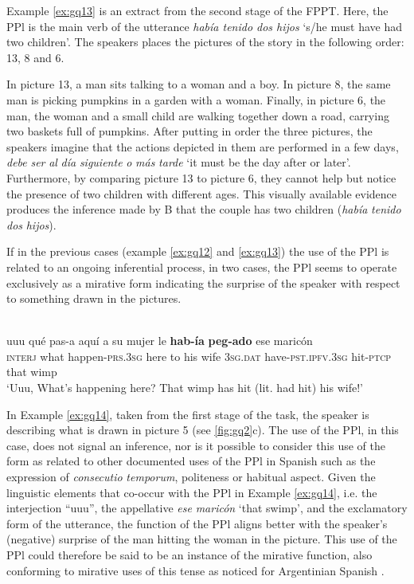\documentclass[output=paper]{langsci/langscibook}
\begin{document}
Example \ref{ex:gq13} is an extract from the second stage of the FPPT. Here, the PPl is the main verb of the utterance \textit{había tenido dos hijos} ‘s/he must have had two children’. The speakers places the pictures of the story in the following order: 13, 8 and 6. %


In picture 13, a man sits talking to a woman and a boy. In picture 8, the same man is picking pumpkins in a garden with a woman. Finally, in picture 6, the man, the woman and a small child are walking together down a road, carrying two baskets full of pumpkins. After putting in order the three pictures, the speakers imagine that the actions depicted in them are performed in a few days, \textit{debe} \textit{ser} \textit{al} \textit{día} \textit{siguiente} \textit{o} \textit{más} \textit{tarde} ‘it must be the day after or later’. Furthermore, by comparing picture 13 to picture 6, they cannot help but notice the presence of two children with different ages. This visually available evidence produces the inference made by B that the couple has two children (\textit{había} \textit{tenido} \textit{dos} \textit{hijos}). 

If in the previous cases (example \ref{ex:gq12} and \ref{ex:gq13}) the use of the PPl is related to an ongoing inferential process, in two cases, the PPl seems to operate exclusively as a mirative form indicating the surprise of the speaker with respect to something drawn in the pictures.

\ea \label{ex:gq14}
\\
	\gll uuu qué pas-a aquí a su mujer le \textbf{hab-ía} \textbf{peg-ado} ese maricón\\
	\textsc{interj} what happen-\textsc{prs.3sg} here to his wife \textsc{3sg.dat} have-\textsc{pst.ipfv.3sg} hit-\textsc{ptcp} that wimp\\
	\glt ‘Uuu, What’s happening here? That wimp has hit (lit. had hit) his wife!’
\z

In Example \ref{ex:gq14}, taken from the first stage of the task, the speaker is describing what is drawn in picture 5 (see \ref{fig:gq2}c). The use of the PPl, in this case, does not signal an inference, nor is it possible to consider this use of the form as related to other documented uses of the PPl in Spanish such as the expression of \textit{consecutio} \textit{temporum}, politeness or habitual aspect. Given the linguistic elements that co-occur with the PPl in Example \ref{ex:gq14}, i.e. the interjection “uuu”, the appellative \textit{ese} \textit{maricón} ‘that swimp’, and the exclamatory form of the utterance, the function of the PPl aligns better with the speaker’s (negative) surprise of the man hitting the woman in the picture. This use of the PPl could therefore be said to be an instance of the mirative function, also conforming to mirative uses of this tense as noticed for Argentinian Spanish \citep{Bermudez2008}.
\end{document}
